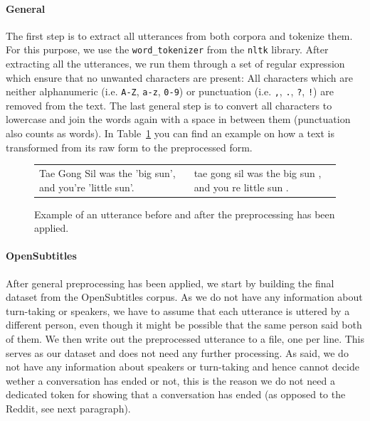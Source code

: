 \paragraph{General} The first step is to extract all utterances from both corpora and tokenize them. For this purpose, we use the \texttt{word\_tokenizer} from the \texttt{nltk} library. After extracting all the utterances, we run them through a set of regular expression which ensure that no unwanted characters are present: All characters which are neither alphanumeric (i.e. \texttt{A-Z}, \texttt{a-z}, \texttt{0-9}) or punctuation (i.e. \texttt{,}, \texttt{.}, \texttt{?}, \texttt{!}) are removed from the text. The last general step is to convert all characters to lowercase and join the words again with a space in between them (punctuation also counts as words). In Table~\ref{data:preprocessing:table_after_preprocessing} you can find an example on how a text is transformed from its raw form to the preprocessed form.
\\
\begin{figure}[h]
	\centering
	\begin{adjustbox}{max width=\textwidth}
		\begin{tabular}{ll}
			\toprule
			\specialcell{Raw Utterance} & \specialcell{Preprocessed Utterance}\\
			\midrule
			Tae Gong Sil was the 'big sun', and you're 'little sun'. & tae gong sil was the big sun , and you re little sun . \\
			\bottomrule
		\end{tabular}
	\end{adjustbox}
	\caption{Example of an utterance before and after the preprocessing has been applied.}
	\label{data:preprocessing:table_after_preprocessing}
\end{figure}

\paragraph{OpenSubtitles} After general preprocessing has been applied, we start by building the final dataset from the OpenSubtitles corpus. As we do not have any information about turn-taking or speakers, we have to assume that each utterance is uttered by a different person, even though it might be possible that the same person said both of them. We then write out the preprocessed utterance to a file, one per line. This serves as our dataset and does not need any further processing. As said, we do not have any information about speakers or turn-taking and hence cannot decide wether a conversation has ended or not, this is the reason we do not need a dedicated token for showing that a conversation has ended (as opposed to the Reddit, see next paragraph).

